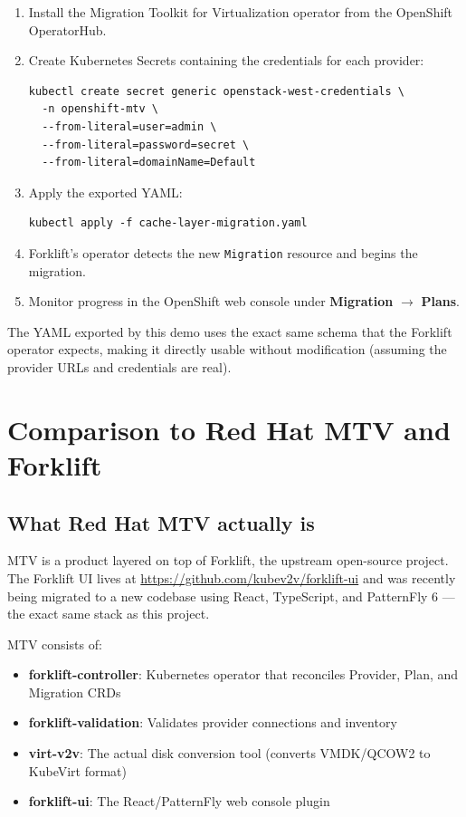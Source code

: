 \documentclass[12pt,a4paper]{article}
\begin{document}
\begin{enumerate}
  \item Install the Migration Toolkit for Virtualization operator from the OpenShift OperatorHub.
  \item Create Kubernetes Secrets containing the credentials for each provider:
\begin{lstlisting}[language={}]
kubectl create secret generic openstack-west-credentials \
  -n openshift-mtv \
  --from-literal=user=admin \
  --from-literal=password=secret \
  --from-literal=domainName=Default
\end{lstlisting}
  \item Apply the exported YAML:
\begin{lstlisting}[language={}]
kubectl apply -f cache-layer-migration.yaml
\end{lstlisting}
  \item Forklift's operator detects the new \texttt{Migration} resource and begins the migration.
  \item Monitor progress in the OpenShift web console under \textbf{Migration} $\to$ \textbf{Plans}.
\end{enumerate}

The YAML exported by this demo uses the exact same schema that the Forklift operator expects, making it directly usable without modification (assuming the provider URLs and credentials are real).

\section{Comparison to Red Hat MTV and Forklift}
\label{sec:comparison}

\subsection{What Red Hat MTV actually is}

MTV is a product layered on top of Forklift, the upstream open-source project. The Forklift UI lives at \url{https://github.com/kubev2v/forklift-ui} and was recently being migrated to a new codebase using React, TypeScript, and PatternFly 6 — the exact same stack as this project.

MTV consists of:
\begin{itemize}
  \item \textbf{forklift-controller}: Kubernetes operator that reconciles Provider, Plan, and Migration CRDs
  \item \textbf{forklift-validation}: Validates provider connections and inventory
  \item \textbf{virt-v2v}: The actual disk conversion tool (converts VMDK/QCOW2 to KubeVirt format)
  \item \textbf{forklift-ui}: The React/PatternFly web console plugin
\end{itemize}
\end{document}
